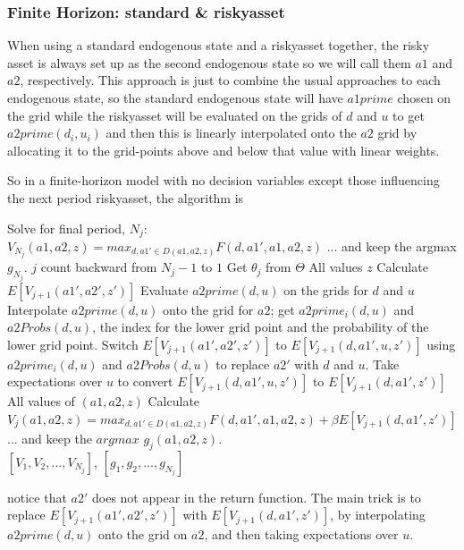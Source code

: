\subsubsection{Finite Horizon: standard \& riskyasset}
When using a standard endogenous state and a riskyasset together, the risky asset is always set up as the second endogenous state so we will call them $a1$ and $a2$, respectively. This approach is just to combine the usual approaches to each endogenous state, so the standard endogenous state will have $a1prime$ chosen on the grid while the riskyasset will be evaluated on the grids of $d$ and $u$ to get $a2prime(d_i,u_i)$ and then this is linearly interpolated onto the $a2$ grid by allocating it to the grid-points above and below that value with linear weights.

So in a finite-horizon model with no decision variables except those influencing the next period riskyasset, the algorithm is
\begin{algorithmic}
 \State Solve for final period, $N_j$: $V_{N_j}(a1,a2,z)=max_{d,a1' \in D(a1,a2,z)} F(d,a1',a1,a2,z)$
 \State ... and keep the argmax $g_{N_j}$.
 \For $j$ count backward from $N_j-1$ to $1$
   \State Get $\theta_j$ from $\Theta$
   \For All values $z$
    \State Calculate $E[V_{j+1}(a1',a2',z')]$
    \State Evaluate $a2prime(d,u)$ on the grids for $d$ and $u$
    \State Interpolate $a2prime(d,u)$ onto the grid for $a2$; get $a2prime_i(d,u)$ and $a2Probs(d,u)$, the index for the lower grid point and the probability of the lower grid point.
    \State Switch $E[V_{j+1}(a1',a2',z')]$ to $E[V_{j+1}(d,a1',u,z')]$ using $a2prime_i(d,u)$ and $a2Probs(d,u)$ to replace $a2'$ with $d$ and $u$.
    \State Take expectations over $u$ to convert $E[V_{j+1}(d,a1',u,z')]$ to $E[V_{j+1}(d,a1',z')]$
    \For All values of $(a1,a2,z)$
     \State Calculate $V_j(a1,a2,z)=max_{d,a1' \in D(a1,a2,z)} F(d,a1',a1,a2,z)+\beta E[V_{j+1}(d, a1',z')]$
     \State ... and keep the $argmax$ $g_j(a1,a2,z)$.
     \EndFor
   \EndFor
  \EndFor
   \\ \Return $[V_1,V_2,...,V_{N_j}]$, $[g_1,g_2,...,g_{N_j}]$
\end{algorithmic}
notice that $a2'$ does not appear in the return function. The main trick is to replace $E[V_{j+1}(a1',a2',z')]$ with $E[V_{j+1}(d,a1',z')]$, by interpolating $a2prime(d,u)$ onto the grid on $a2$, and then taking expectations over $u$.

